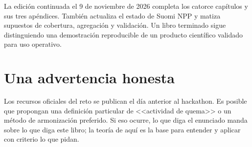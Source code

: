 La edición continuada el 9 de noviembre de 2026 completa los catorce capítulos y sus
tres apéndices. También actualiza el estado de Suomi NPP y matiza supuestos de cobertura,
agregación y validación. Un libro terminado sigue distinguiendo una demostración
reproducible de un producto científico validado para uso operativo.

\section*{Una advertencia honesta}

Los recursos oficiales del reto se publican el día anterior al hackathon. Es posible que
propongan una definición particular de <<actividad de quema>> o un método de armonización
preferido. Si eso ocurre, lo que diga el enunciado manda sobre lo que diga este libro; la teoría
de aquí es la base para entender y aplicar con criterio lo que pidan.
